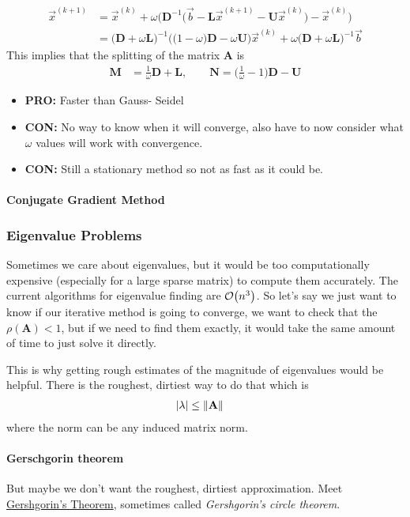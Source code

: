 \documentclass[a4paper,12pt]{article} %
\begin{document}
\begin{align}
	\vec{x}^{(k+1)} &= \vec{x}^{(k)} + \omega\bigg(\textbf{D}^{-1}\big(\vec{b} - \textbf{L}\vec{x}^{(k+1)} - \textbf{U}\vec{x}^{(k)}\big) - \vec{x}^{(k)} \bigg)\\
	&= \big( \textbf{D}+ \omega \textbf{L}\big)^{-1} \bigg(\big(1-\omega\big)\textbf{D} - \omega\textbf{U}\bigg)\vec{x}^{(k)} + \omega \big( \textbf{D}+ \omega \textbf{L}\big)^{-1} \vec{b}
\end{align}
This implies that the splitting of the matrix $\textbf{A}$ is
\begin{align}
	\textbf{M}&= \frac{1}{\omega} \textbf{D} + \textbf{L}, \qquad \textbf{N} = \bigg( \frac{1}{\omega} - 1\bigg) \textbf{D} - \textbf{U}
\end{align}
\begin{itemize}
	\item \textbf{PRO:} Faster than Gauss- Seidel
	\item \textbf{CON:} No way to know when it will converge, also have to now consider what $\omega$ values will work with convergence.
	\item \textbf{CON:} Still a stationary method so not as fast as it could be.
\end{itemize}
	
\paragraph{Conjugate Gradient Method}

\subsubsection{Eigenvalue Problems}
Sometimes we care about eigenvalues, but it would be too computationally expensive (especially for a large sparse matrix) to compute them accurately. The current algorithms for eigenvalue finding are $\order{n^3}$. So let's say we just want to know if our iterative method is going to converge, we want to check that the $\rho(\textbf{A})<1$, but if we need to find them exactly, it would take the same amount of time to just solve it directly. 

This is why getting rough estimates of the magnitude of eigenvalues would be helpful. There is the roughest, dirtiest way to do that which is 
\begin{align}
	|\lambda| &\leq \norm{\textbf{A}}
\end{align}
where the norm can be any induced matrix norm. 
\paragraph{Gerschgorin theorem}
But maybe we don't want the roughest, dirtiest approximation. Meet \underline{Gershgorin's Theorem}, sometimes called \textit{Gershgorin's circle theorem}. 
\end{document}
